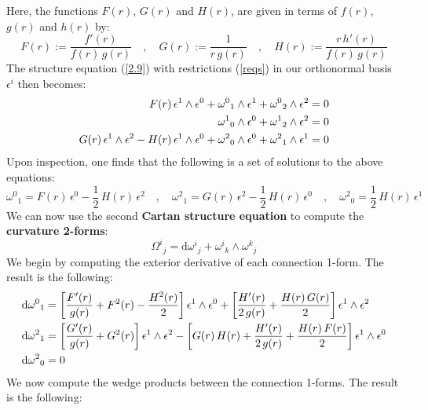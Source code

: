 %
%
Here, the functions $F(r)$, $G(r)$ and $H(r)$, are given in terms of $f(r)$, $g(r)$ and $h(r)$ by:
%
%
\begin{equation}\label{2.11}
F(r) := \frac{f'(r)}{f(r) \, g(r)}
\quad , \quad
G(r) := \frac{1}{r \, g(r)}
\quad , \quad
H(r) := \frac{r \, h'(r)}{f(r) \, g(r)}
\end{equation}
%
%
The structure equation (\ref{2.9}) with restrictions (\ref{reqs}) in our orthonormal basis $\epsilon^i$ then becomes:
%
%
\begin{align}
F(r) \, \epsilon^1 \wedge \epsilon^0
+ {\omega^0}_1 \wedge \epsilon^1
+ {\omega^0}_2 \wedge \epsilon^2 & = 0
\notag\\
{\omega^1}_0 \wedge \epsilon^0
+ {\omega^1}_2 \wedge \epsilon^2 & = 0
\notag\\
G(r) \, \epsilon^1 \wedge \epsilon^2
- H(r) \, \epsilon^1 \wedge \epsilon^0
+ {\omega^2}_0 \wedge \epsilon^0
+ {\omega^2}_1 \wedge \epsilon^1 & = 0
\end{align}
%
Upon inspection, one finds that the following is a set of solutions to the above equations:
%
%
\begin{equation}
{\omega^0}_1 = F(r) \, \epsilon^0 - \frac{1}{2} \, H(r) \, \epsilon^2
\quad , \quad
{\omega^2}_1 = G(r) \, \epsilon^2 - \frac{1}{2} \, H(r) \, \epsilon^0
\quad , \quad
{\omega^2}_0 = \frac{1}{2} \, H(r) \, \epsilon^1
\end{equation}
%
%
We can now use the second \textbf{Cartan structure equation} to compute the \textbf{curvature 2-forms}:
%
%
\begin{equation}\label{2.10}
{\Omega^i}_j = \mathrm{d}{\omega^i}_j + {\omega^i}_k \wedge {\omega^k}_j
\end{equation}
%
%
We begin by computing the exterior derivative of each connection 1-form. The result is the following:
%
%
\begin{align}
\mathrm{d}{\omega^0}_1 & = \bigg[ \frac{F'(r)}{g(r)}
+ F^2(r)
- \frac{H^2(r)}{2} \bigg] \, \epsilon^1 \wedge \epsilon^0
%
+ \bigg[ \frac{H'(r)}{2 \, g(r)}
+ \frac{H(r) \, G(r)}{2} \bigg] \, \epsilon^1 \wedge \epsilon^2
\notag\\
\mathrm{d}{\omega^2}_1 & = \bigg[ \frac{G'(r)}{g(r)}
+ G^2(r) \bigg] \, \epsilon^1 \wedge \epsilon^2
%
- \bigg[ G(r) \, H(r)
+ \frac{H'(r)}{2 \, g(r)}
+ \frac{H(r) \, F(r)}{2} \bigg] \, \epsilon^1 \wedge \epsilon^0
\notag\\
\mathrm{d}{\omega^2}_0 & = 0
\end{align}
%
%
We now compute the wedge products between the connection 1-forms. The result is the following:
